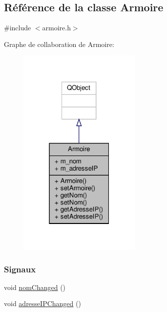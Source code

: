 \hypertarget{class_armoire}{}\subsection{Référence de la classe Armoire}
\label{class_armoire}


{\ttfamily \#include $<$armoire.\+h$>$}



Graphe de collaboration de Armoire\+:\nopagebreak
\begin{figure}[H]
\begin{center}
\leavevmode
\includegraphics[width=171pt]{class_armoire__coll__graph}
\end{center}
\end{figure}
\subsubsection*{Signaux}
\begin{DoxyCompactItemize}
\item 
void \hyperlink{class_armoire_ade857388a0843a13530b463e44be9a72}{nom\+Changed} ()
\item 
void \hyperlink{class_armoire_a97945eb55aa0acea7a74ab6c986534e4}{adresse\+I\+P\+Changed} ()
\end{DoxyCompactItemize}
